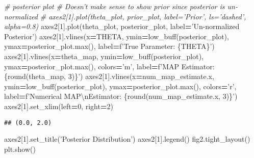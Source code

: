 \documentclass[]{article}
\newenvironment{Shaded}{\begin{snugshade}}{\end{snugshade}}
\newcommand{\BuiltInTok}[1]{#1}
\newcommand{\CharTok}[1]{\textcolor[rgb]{0.31,0.60,0.02}{#1}}
\newcommand{\CommentTok}[1]{\textcolor[rgb]{0.56,0.35,0.01}{\textit{#1}}}
\newcommand{\DecValTok}[1]{\textcolor[rgb]{0.00,0.00,0.81}{#1}}
\newcommand{\NormalTok}[1]{#1}
\newcommand{\OperatorTok}[1]{\textcolor[rgb]{0.81,0.36,0.00}{\textbf{#1}}}
\newcommand{\SpecialCharTok}[1]{\textcolor[rgb]{0.00,0.00,0.00}{#1}}
\newcommand{\SpecialStringTok}[1]{\textcolor[rgb]{0.31,0.60,0.02}{#1}}
\newcommand{\StringTok}[1]{\textcolor[rgb]{0.31,0.60,0.02}{#1}}
\begin{document}
\begin{Shaded}
\begin{Highlighting}[]
\CommentTok{# posterior plot}
\CommentTok{# Doesn't make sense to show prior since posterior is un-normalized}
\CommentTok{# axes2[1].plot(theta_plot, prior_plot, label='Prior', ls='dashed', alpha=0.8)}
\NormalTok{axes2[}\DecValTok{1}\NormalTok{].plot(theta_plot, posterior_plot, label}\OperatorTok{=}\StringTok{'Un-normalized Posterior'}\NormalTok{)}
\NormalTok{axes2[}\DecValTok{1}\NormalTok{].vlines(x}\OperatorTok{=}\NormalTok{THETA, ymin}\OperatorTok{=}\NormalTok{low_buff(posterior_plot), ymax}\OperatorTok{=}\NormalTok{posterior_plot.}\BuiltInTok{max}\NormalTok{(),}
\NormalTok{          label}\OperatorTok{=}\SpecialStringTok{f'True Parameter: }\SpecialCharTok{\{}\NormalTok{THETA}\SpecialCharTok{\}}\SpecialStringTok{'}\NormalTok{)}
\NormalTok{axes2[}\DecValTok{1}\NormalTok{].vlines(x}\OperatorTok{=}\NormalTok{theta_map, ymin}\OperatorTok{=}\NormalTok{low_buff(posterior_plot), ymax}\OperatorTok{=}\NormalTok{posterior_plot.}\BuiltInTok{max}\NormalTok{(),}
\NormalTok{          colors}\OperatorTok{=}\StringTok{'m'}\NormalTok{, label}\OperatorTok{=}\SpecialStringTok{f'MAP Estimator: }\SpecialCharTok{\{}\BuiltInTok{round}\NormalTok{(theta_map, }\DecValTok{3}\NormalTok{)}\SpecialCharTok{\}}\SpecialStringTok{'}\NormalTok{)}
\NormalTok{axes2[}\DecValTok{1}\NormalTok{].vlines(x}\OperatorTok{=}\NormalTok{num_map_estimate.x, ymin}\OperatorTok{=}\NormalTok{low_buff(posterior_plot), ymax}\OperatorTok{=}\NormalTok{posterior_plot.}\BuiltInTok{max}\NormalTok{(),}
\NormalTok{          colors}\OperatorTok{=}\StringTok{'r'}\NormalTok{, label}\OperatorTok{=}\SpecialStringTok{f'Numerical MAP}\CharTok{\textbackslash{}n}\SpecialStringTok{Estimator: }\SpecialCharTok{\{}\BuiltInTok{round}\NormalTok{(num_map_estimate.x, }\DecValTok{3}\NormalTok{)}\SpecialCharTok{\}}\SpecialStringTok{'}\NormalTok{)}
\NormalTok{axes2[}\DecValTok{1}\NormalTok{].set_xlim(left}\OperatorTok{=}\DecValTok{0}\NormalTok{, right}\OperatorTok{=}\DecValTok{2}\NormalTok{)}
\end{Highlighting}
\end{Shaded}

\begin{verbatim}
## (0.0, 2.0)
\end{verbatim}

\begin{Shaded}
\begin{Highlighting}[]
\NormalTok{axes2[}\DecValTok{1}\NormalTok{].set_title(}\StringTok{'Posterior Distribution'}\NormalTok{)}
\NormalTok{axes2[}\DecValTok{1}\NormalTok{].legend()}
\NormalTok{fig2.tight_layout()}
\NormalTok{plt.show()}
\end{Highlighting}
\end{Shaded}
\end{document}
